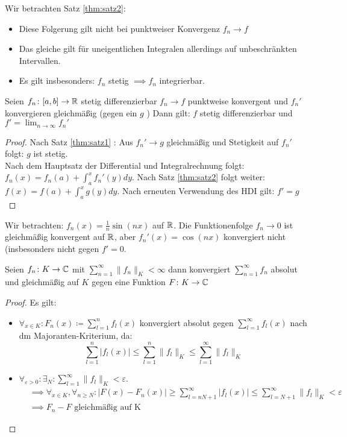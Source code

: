 \begin{remark}
	Wir betrachten Satz \ref{thm:satz2}:
	\begin{itemize}
		\item Diese Folgerung gilt nicht bei punktweiser Konvergenz $f_n \to f$ 
		\item Das gleiche gilt für uneigentlichen Integralen allerdings auf unbeschränkten Intervallen.
		\item Es gilt insbesonders: $f_n$ stetig $\implies f_n$ integrierbar.

	\end{itemize}
\end{remark}
\begin{theorem}
    \label{thm:satz3}
	Seien $f_n \colon [a,b] \to \mathbb{R} $ stetig differenzierbar $f_n \to f$ punktweise konvergent und $f_n'$ konvergieren gleichmäßig (gegen ein $g$ ) Dann gilt: $f$ stetig differenzierbar und $f'= \lim_{n \to \infty} f_n'$ 
\end{theorem}
\begin{proof}
	Nach Satz \ref{thm:satz1} : Aus $f_n' \to g$ gleichmäßig und Stetigkeit auf $f_n'$ folgt: $g$ ist stetig. \\
	Nach dem Hauptsatz der Differential und Integralrechnung folgt: $f_n(x) =f_n(a) + \int_a^x f_n'(y) dy$. Nach Satz \ref{thm:satz2} folgt weiter: $f(x)=f(a) + \int_a^x g(y) dy$. Nach erneuten Verwendung des HDI gilt: $f'=g$   
\end{proof}
\begin{example}
Wir betrachten:
$f_n(x) = \frac{1}{n}\sin(nx)$ auf $\mathbb{R}$. Die Funktionenfolge $f_n \to 0$ ist gleichmäßig konvergent auf $\mathbb{R}$, aber $f_n'(x) = \cos(nx)$ konvergiert nicht (insbesonders nicht gegen $f'=0$.   
\end{example}
\begin{theorem}
	\label{thm:satz4}
	Seien $f_n \colon K \to \mathbb{C} $ mit $\sum_{n=1}^{\infty}\|f_n\|_K < \infty$ dann konvergiert $\sum_{n=1}^{\infty}f_n$ absolut und gleichmäßig auf $K$ gegen eine Funktion $F \colon K \to \mathbb{C} $ 
\end{theorem}
\begin{proof}
Es gilt:
\begin{itemize}
	\item $\forall_{x \in K}: F_n(x) \coloneqq \sum_{l=1}^{n}f_l(x) $ konvergiert absolut gegen $\sum_{l=1}^{\infty}f_l(x)$ nach dm Majoranten-Kriterium, da:
		\[
		\sum_{l=1}^{n}|f_l(x)| \le \sum_{l=1}^{n}\|f_l\|_K \le \sum_{l=1}^{\infty}\|f_l\|_K
		\]
	\item $\forall_{\varepsilon>0}:\exists_{N}: \sum_{l=1}^{\infty}\|f_l\|_K <\varepsilon  $.
		\begin{align*}
		&\implies \forall_{x \in K}, \forall_{n \ge N}: |F(x) -F_n(x)| \ge \sum_{l=nN+1}^{\infty}|f_l(x)| \le \sum_{l=N+1}^{\infty}\|f_l\|_K < \varepsilon \\
		&\implies F_n-F \text{ gleichmäßig auf K}
		\end{align*}
\end{itemize}
\end{proof}
